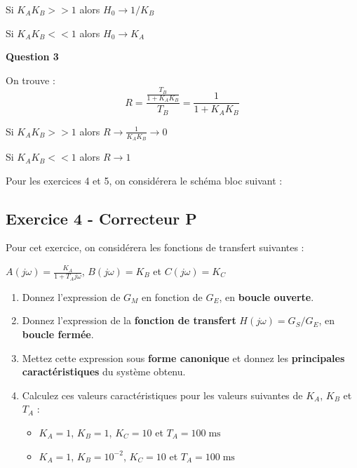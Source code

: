 \documentclass[a4paper,11pt,twoside]{book} %
\begin{document}
Si $K_A K_B >> 1$ alors $H_0 \to 1/K_B$

Si $K_A K_B << 1$ alors $H_0 \to K_A$


\noindent\hrulefill

\medskip
\textbf{Question 3}


On trouve : $$R = \frac{\frac{T_B}{1 + K_A K_B}}{T_B} = \frac{1}{1 + K_A K_B}$$

Si $K_A K_B >> 1$ alors $R \to \frac{1}{K_A K_B} \to 0$

Si $K_A K_B << 1$ alors $R \to 1$

\newpage

Pour les exercices 4 et 5, on considérera le schéma bloc suivant :


\begin{center}
{\Large
{}
}
\end{center}


\subsection{Exercice 4 - Correcteur P}

Pour cet exercice, on considérera les fonctions de transfert suivantes : 

$A(j \omega) = \frac{K_A}{1 + T_A j \omega}$, $B(j \omega) = K_B$ et $C(j \omega) = K_C$ 

\begin{enumerate}
	\item Donnez l'expression de $G_M$ en fonction de $G_E$, en \textbf{boucle ouverte}.
		
	\item Donnez l'expression de la \textbf{fonction de transfert} $H(j \omega) = G_S / G_E$, en \textbf{boucle fermée}.
	\item Mettez cette expression sous \textbf{forme canonique} et donnez les \textbf{principales caractéristiques} du système obtenu.
	\item Calculez ces valeurs caractéristiques pour les valeurs suivantes de $K_A$, $K_B$ et $T_A$ :
	\begin{itemize}
		\item $K_A = 1$, $K_B = 1$, $K_C = 10$ et $T_A = 100\operatorname{ms}$
		\item $K_A = 1$, $K_B = 10^{-2}$, $K_C = 10$ et $T_A = 100\operatorname{ms}$
	\end{itemize}
\end{enumerate}
\end{document}
